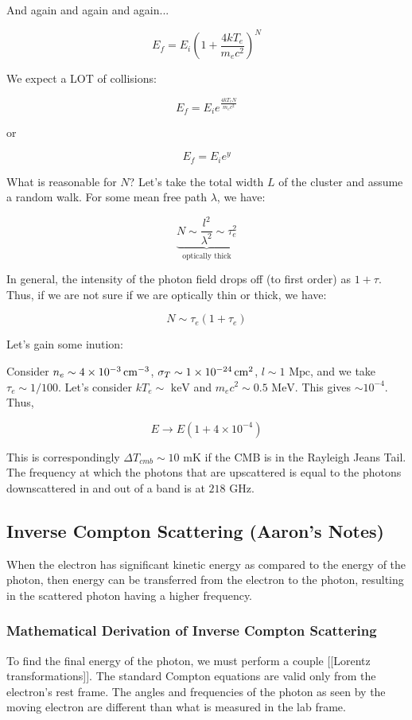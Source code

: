 \documentclass{article}
\newcommand{\unit}[1]{{\,\rm #1}}
\newcommand{\cm}{\unit{cm}}
\begin{document}
And again and again and again...

$$
E_f = E_i \left(1 + \frac{4kT_e}{m_e c^2}\right)^{N}
$$

We expect a LOT of collisions:

$$
\boxed{E_f = E_i e^{\frac{4kT_eN}{m_e c^2}}}
$$

or

$$
\boxed{E_f = E_i e^y}
$$

What is reasonable for $N$? Let's take the total width $L$ of the cluster and assume a random walk. For some mean free path $\lambda$, we have:

$$
\underbrace{N \sim \frac{l^2}{\lambda^2} \sim \tau_e ^2}_\text{optically thick}
$$

In general, the intensity of the photon field drops off (to first order) as $1+ \tau$. Thus, if we are not sure if we are optically thin or thick, we have:

$$
N \sim \tau_e \left(1+\tau_e\right)
$$

Let's gain some inution:

Consider $n_e \sim 4\times 10^{-3} \cm^{-3}$, $\sigma_T \sim 1 \times 10^{-24} \cm^2$, $l \sim 1 \text{ Mpc}$, and we take $\tau_e \sim 1/100$. Let's consider $kT_e \sim \text{ keV}$ and $m_e c^2 \sim 0.5 \text{ MeV}$. This gives $\sim 10^{-4}$. Thus,

$$
E \rightarrow E(1 + 4\times10^{-4})
$$

This is correspondingly $\Delta T_{cmb} \sim 10 \text{ mK}$ if the CMB is in the Rayleigh Jeans Tail. The frequency at which the photons that are upscattered is equal to the photons downscattered  in and out of a band is at $218 \text{ GHz}$.

\subsection{Inverse Compton Scattering (Aaron's Notes)}

When the electron has significant kinetic energy as compared to the energy of the photon, then energy can be transferred from the electron to the photon, resulting in the scattered photon having a higher frequency. 

\subsubsection{Mathematical Derivation of Inverse Compton Scattering}

To find the final energy of the photon, we must perform a couple [[Lorentz transformations]]. The standard Compton equations are valid only from the electron's rest frame. The angles and frequencies of the photon as seen by the moving electron are different than what is measured in the lab frame.
\end{document}
